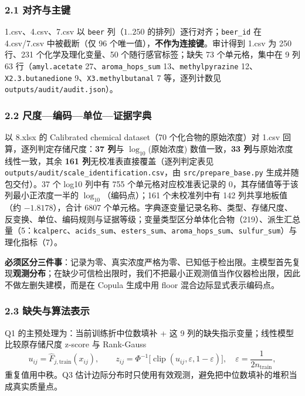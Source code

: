 \documentclass[
  11pt,
]{article}
\begin{document}
\subsubsection{2.1 对齐与主键}\label{ux5bf9ux9f50ux4e0eux4e3bux952e}

1.csv、4.csv、7.csv 以 \texttt{beer} 列（\(1..250\)
的排列）逐行对齐；\texttt{beer\_id} 在 4.csv/7.csv 中被截断（仅 96
个唯一值），\textbf{不作为连接键}。审计得到 1.csv 为 250 行、231
个化学及理化变量、50 个随行感官标签；缺失 73 个单元格，集中在 9 列 63
行（\texttt{amyl.acetate} 27、\texttt{aroma\_hops\_sum}
13、\texttt{methylpyrazine} 12、\texttt{X2.3.butanedione}
9、\texttt{X3.methylbutanal} 7 等，逐列计数见
\texttt{outputs/audit/audit.json}）。

\subsubsection{2.2
尺度---编码---单位---证据字典}\label{ux5c3aux5ea6ux7f16ux7801ux5355ux4f4dux8bc1ux636eux5b57ux5178}

以 8.xlsx 的 Calibrated chemical dataset（70 个化合物的原始浓度）对
1.csv 回算，逐列判定存储尺度：\textbf{37 列}与 \(\log_{10}\)(原始浓度)
数值一致，\textbf{33 列}与原始浓度线性一致，其余 \textbf{161
列}无校准表直接覆盖（逐列判定表见
\texttt{outputs/audit/scale\_identification.csv}，由
\texttt{src/prepare\_base.py} 生成并随包交付）。37 个 log10 列中有 755
个单元格对应校准表记录的 0，其存储值等于该列最小正浓度一半的
\(\log_{10}\)（编码点）；161 个未校准列中有 142 列共享地板值（约
\(-1.8178\)），合计 6807
个单元格。字典逐变量记录名称、类型、存储尺度、反变换、单位、编码规则与证据等级；变量类型区分单体化合物（219）、派生汇总量（5：\texttt{kcalperc}、\texttt{acids\_sum}、\texttt{esters\_sum}、\texttt{aroma\_hops\_sum}、\texttt{sulfur\_sum}）与理化指标（7）。

\textbf{必须区分三件事}：记录为零、真实浓度严格为零、已知低于检出限。主模型首先复现\textbf{观测分布}；在缺少可信检出限时，我们不把最小正观测值当作仪器检出限，因此不做左删失建模，而是在
Copula 生成中用 floor 混合边际显式表示编码点。

\subsubsection{2.3
缺失与算法表示}\label{ux7f3aux5931ux4e0eux7b97ux6cd5ux8868ux793a}

Q1 的主预处理为：当前训练折中位数填补 + 这 9
列的缺失指示变量；线性模型比较原存储尺度 z-score 与 Rank-Gauss \[
u_{ij}=\widehat F_{j,\mathrm{train}}(x_{ij}),\qquad z_{ij}=\Phi^{-1}\big[\operatorname{clip}(u_{ij},\varepsilon,1-\varepsilon)\big],\quad \varepsilon=\frac{1}{2n_{\mathrm{train}}},
\] 重复值用中秩。Q3
估计边际分布时只使用有效观测，避免把中位数填补的堆积当成真实质量点。
\end{document}
